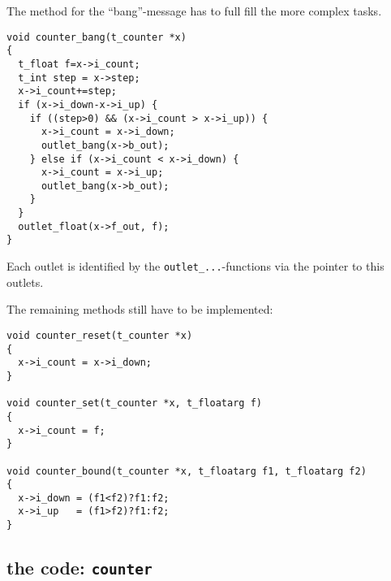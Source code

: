 \documentclass[12pt, a4paper,english,titlepage]{article}
\begin{document}
The method for the ``bang''-message has to full fill the more complex tasks.

\begin{verbatim}
void counter_bang(t_counter *x)
{
  t_float f=x->i_count;
  t_int step = x->step;
  x->i_count+=step;
  if (x->i_down-x->i_up) {
    if ((step>0) && (x->i_count > x->i_up)) {
      x->i_count = x->i_down;
      outlet_bang(x->b_out);
    } else if (x->i_count < x->i_down) {
      x->i_count = x->i_up;
      outlet_bang(x->b_out);
    }
  }
  outlet_float(x->f_out, f);
}
\end{verbatim}

Each outlet is identified by the \verb+outlet_...+-functions via the
pointer to this outlets.

The remaining methods still have to be implemented:

\begin{verbatim}
void counter_reset(t_counter *x)
{
  x->i_count = x->i_down;
}

void counter_set(t_counter *x, t_floatarg f)
{
  x->i_count = f;
}

void counter_bound(t_counter *x, t_floatarg f1, t_floatarg f2)
{
  x->i_down = (f1<f2)?f1:f2;
  x->i_up   = (f1>f2)?f1:f2;
}
\end{verbatim}

\subsection{the code: \tt counter}
\end{document}
